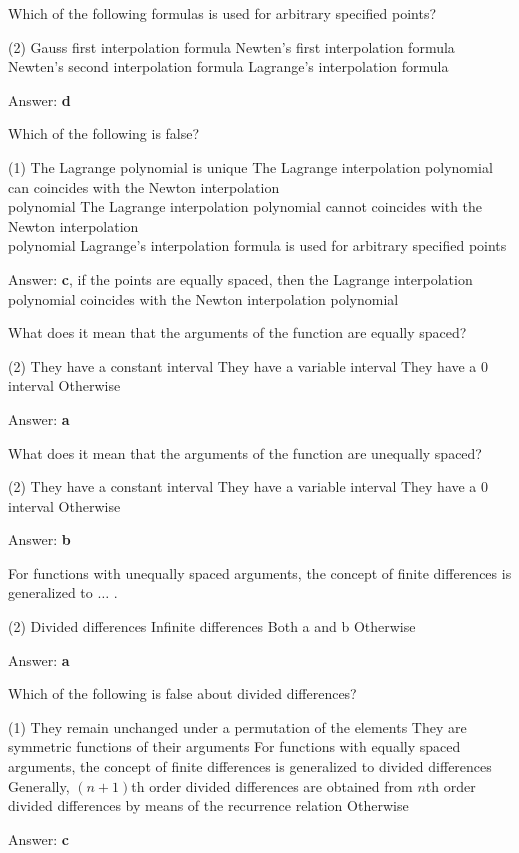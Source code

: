 \documentclass{exam}
\begin{document}
\begin{questions}
	\question Which of the following formulas is used for arbitrary specified points?
	\begin{tasks}(2)
		\task Gauss first interpolation formula
		\task Newten's first interpolation formula
		\task Newten's second interpolation formula
		\task Lagrange's interpolation formula
	\end{tasks}
	Answer: \textbf{d}

	\question Which of the following is false?
	\begin{tasks}(1)
		\task The Lagrange polynomial is unique
		\task The Lagrange interpolation polynomial can coincides with the Newton interpolation \\polynomial
		\task The Lagrange interpolation polynomial cannot coincides with the Newton interpolation \\polynomial
		\task Lagrange's interpolation formula is used for arbitrary specified points
	\end{tasks}
	Answer: \textbf{c}, if the points are equally spaced, then the Lagrange interpolation polynomial coincides with the Newton interpolation polynomial

	\question What does it mean that the arguments of the function are equally spaced?
	\begin{tasks}(2)
		\task They have a constant interval
		\task They have a variable interval
		\task They have a 0 interval
		\task Otherwise
	\end{tasks}
	Answer: \textbf{a}

	\question What does it mean that the arguments of the function are unequally spaced?
	\begin{tasks}(2)
		\task They have a constant interval
		\task They have a variable interval
		\task They have a 0 interval
		\task Otherwise
	\end{tasks}
	Answer: \textbf{b}

	\question For functions with unequally spaced arguments, the concept of finite differences is generalized to $\dots$ .
	\begin{tasks}(2)
		\task Divided differences
		\task Infinite differences
		\task Both a and b
		\task Otherwise
	\end{tasks}
	Answer: \textbf{a}

	\question Which of the following is false about divided differences?
	\begin{tasks}(1)
		\task They remain unchanged under a permutation of the elements
		\task They are symmetric functions of their arguments
		\task For functions with equally spaced arguments, the concept of finite differences is generalized to divided differences
		\task Generally, $(n+1)$th order divided differences are obtained from $n$th order divided differences by means of the recurrence relation
		\task Otherwise
	\end{tasks}
	Answer: \textbf{c}


\end{questions}
\end{document}
